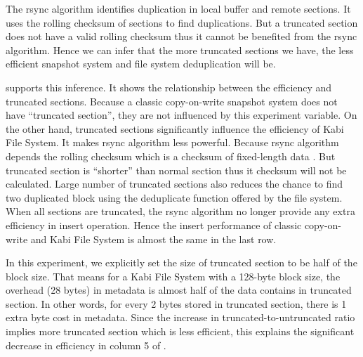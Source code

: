     The rsync algorithm identifies duplication in local buffer and remote sections. It uses the rolling checksum of sections to find duplications. But a truncated section does not have a valid rolling checksum thus it cannot be benefited from the rsync algorithm. Hence we can infer that the more truncated sections we have, the less efficient snapshot system and file system deduplication will be.

     supports this inference. It shows the relationship between the efficiency and truncated sections. Because a classic copy-on-write snapshot system does not have ``truncated section'', they are not influenced by this experiment variable. On the other hand, truncated sections significantly influence the efficiency of Kabi File System. It makes rsync algorithm less powerful. Because rsync algorithm depends the rolling checksum which is a checksum of fixed-length data . But truncated section is ``shorter'' than normal section thus it checksum will not be calculated. Large number of truncated sections also reduces the chance to find two duplicated block using the deduplicate function offered by the file system. When all sections are truncated, the rsync algorithm no longer provide any extra efficiency in insert operation. Hence the insert performance of classic copy-on-write and Kabi File System is almost the same in the last row.

    In this experiment, we explicitly set the size of truncated section to be half of the block size. That means for a Kabi File System with a 128-byte block size, the overhead (28 bytes) in metadata is almost half of the data contains in truncated section. In other words, for every 2 bytes stored in truncated section, there is 1 extra byte cost in metadata. Since the increase in truncated-to-untruncated ratio implies more truncated section which is less efficient, this explains the significant decrease in efficiency in column 5 of .

